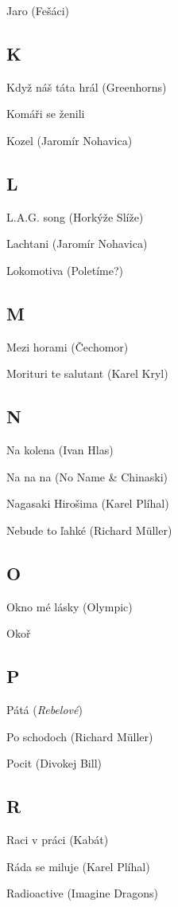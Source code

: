 \begin{multicols}{2}
Jaro (Fešáci)

\subsection*{K}
Když náš táta hrál (Greenhorns)

Komáři se ženili

Kozel (Jaromír Nohavica)

\subsection*{L}
L.A.G. song (Horkýže Slíže)

Lachtani (Jaromír Nohavica)

Lokomotiva (Poletíme?)

\subsection*{M}
Mezi horami (Čechomor)

Morituri te salutant (Karel Kryl)

\subsection*{N}
Na kolena (Ivan Hlas)

Na na na (No Name \& Chinaski)

Nagasaki Hirošima (Karel Plíhal)

Nebude to ľahké (Richard Müller)

\subsection*{O}
Okno mé lásky (Olympic)

Okoř

\subsection*{P}
Pátá (\emph{Rebelové})

Po schodoch (Richard Müller)

Pocit (Divokej Bill)

\subsection*{R}
Raci v práci (Kabát)

Ráda se miluje (Karel Plíhal)

Radioactive (Imagine Dragons)


\end{multicols}
